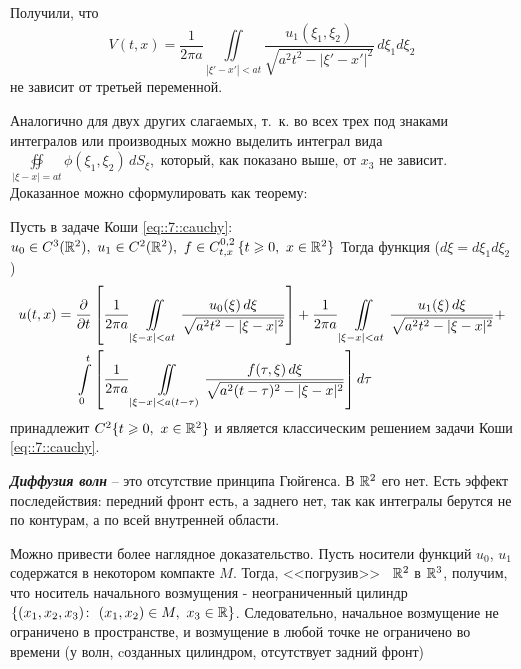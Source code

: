 \documentclass[../main.tex]{subfiles}
\begin{document}
Получили, что 
\[
V(t, x)=\frac{1}{2\pi a}\iint\limits_{|\xi' -x'|<at}\frac{u_1(\xi_1, \xi_2)}{\sqrt{a^2t^2-|\xi' -x'|^2}}\, d\xi_1d\xi_2
\]
не зависит от третьей переменной. 

Аналогично для двух других слагаемых, т.~к. во всех трех под знаками интегралов или производных можно выделить интеграл вида $\displaystyle\oiint\limits_{|\xi -x|=at}\phi (\xi_1, \xi_2)\, dS_{\xi}$,\, который, как показано выше, от $x_3$ не зависит. Доказанное можно сформулировать как теорему:

\begin{theorem}
Пусть в задаче Коши \eqref{eq::7::cauchy}:
$u_0 \in C^3(\R^2),\ 
u_1 \in C^2(\R^2),\
f \in C_{t,x}^{0,2}\, \{t\geq 0,\ x \in \R^2\}$ 
Тогда функция ($d\xi =d\xi_1d\xi_2$)
\[
\begin{split}
u(t,x) = \dfrac{\partial }{\partial t} &\left[ \frac{1}{2\pi a}
\iint\limits_{|\xi - x| < at} \frac{u_0(\xi)\, d\xi}{\sqrt{a^2t^2-|\xi - x|^2}} \right]
+ \frac{1}{2\pi a} \iint\limits_{|\xi - x|<at} \frac{u_1(\xi)\, d\xi}{\sqrt{a^2t^2-|\xi - x|^2}} +\\
\int\limits_0^t &\left[ \frac{1}{2\pi a}
\iint\limits_{|\xi - x| < a(t-\tau)} \frac{f(\tau,\xi)\, d\xi}{\sqrt{a^2(t-\tau )^2-|\xi - x|^2}} \right] d\tau
\end{split}
\]
принадлежит $C^2\{t\geqslant 0,\ x\in\mathbb{R}^2 \}$ и является классическим решением задачи Коши \eqref{eq::7::cauchy}.
\end{theorem}
\begin{definition} \textbf{\emph{Диффузия волн}}
-- это отсутствие принципа Гюйгенса. В $\mathbb{R}^2$ его нет. Есть эффект последействия: передний фронт есть, а заднего нет, так как интегралы берутся не по контурам, а по всей внутренней области.
\end{definition}
Можно привести более наглядное доказательство. Пусть носители функций $u_0$, $u_1$ содержатся в некотором компакте $M$. Тогда, <<погрузив>>~ $\mathbb{R}^2$ в $\mathbb{R}^3$, получим, что носитель начального возмущения - неограниченный цилиндр $\{(x_1, x_2, x_3)\colon ~(x_1, x_2) \in M,~ x_3 \in \mathbb{R} \}$. Следовательно, начальное возмущение не ограничено в пространстве, и возмущение в любой точке не ограничено во времени (у волн, cозданных цилиндром, отсутствует задний фронт)
\end{document}
